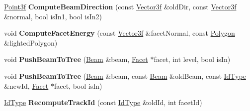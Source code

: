\begin{DoxyCompactItemize}
\mbox{\hyperlink{struct_point3f}{Point3f}} {\bfseries Compute\+Beam\+Direction} (const \mbox{\hyperlink{struct_point3f}{Vector3f}} \&old\+Dir, const \mbox{\hyperlink{struct_point3f}{Vector3f}} \&normal, bool is\+In1, bool is\+In2)
\item 
\mbox{\label{class_scattering_ac1b11b96eaa2a09c4595f4d0f65c5dbe}} 
void {\bfseries Compute\+Facet\+Energy} (const \mbox{\hyperlink{struct_point3f}{Vector3f}} \&facet\+Normal, const \mbox{\hyperlink{class_polygon}{Polygon}} \&lighted\+Polygon)
\item 
\mbox{\label{class_scattering_a8d95065ea7cee053cd7a6bc7540896f6}} 
void {\bfseries Push\+Beam\+To\+Tree} (\mbox{\hyperlink{class_beam}{Beam}} \&beam, \mbox{\hyperlink{class_facet}{Facet}} $\ast$facet, int level, bool is\+In)
\item 
\mbox{\label{class_scattering_a1059cb7f6c1951fdf44bb5ed25a95be4}} 
void {\bfseries Push\+Beam\+To\+Tree} (\mbox{\hyperlink{class_beam}{Beam}} \&beam, const \mbox{\hyperlink{class_beam}{Beam}} \&old\+Beam, const \mbox{\hyperlink{class_big_integer}{Id\+Type}} \&new\+Id, \mbox{\hyperlink{class_facet}{Facet}} $\ast$facet, bool is\+In)
\item 
\mbox{\label{class_scattering_a7384cc5c2328ab37d7235a3b858eede0}} 
\mbox{\hyperlink{class_big_integer}{Id\+Type}} {\bfseries Recompute\+Track\+Id} (const \mbox{\hyperlink{class_big_integer}{Id\+Type}} \&old\+Id, int facet\+Id)
\end{DoxyCompactItemize}
